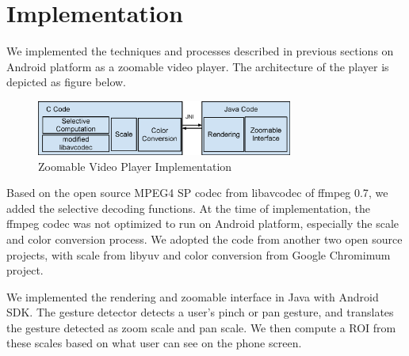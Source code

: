 \section{Implementation}
We implemented the techniques and processes described in previous sections on Android platform\cite{webandroid} as a zoomable video player. The architecture of the player is depicted as figure below.

\begin{figure}
\centering
\includegraphics[height=1.8cm]{playernew.eps}
\caption{Zoomable Video Player Implementation}
\end{figure}
Based on the open source MPEG4 SP codec from libavcodec of ffmpeg 0.7\cite{webffmpeg}, we added the selective decoding functions. At the time of implementation, the ffmpeg codec was not optimized to run on Android platform, especially the scale and color conversion process. We adopted the code from another two open source projects, with scale from libyuv\cite{weblibyuv} and color conversion from Google Chromimum project\cite{webchromium}. 

We implemented the rendering and zoomable interface in Java with Android SDK. The gesture detector detects a user's pinch or pan gesture, and translates the gesture detected as zoom scale and pan scale. We then compute a ROI from these scales based on what user can see on the phone screen. 

